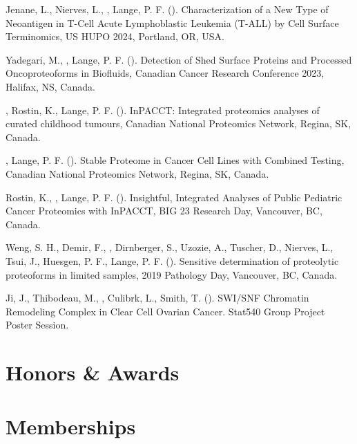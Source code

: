 \documentclass[line]{resonancecv}
\begin{document}
\begin{resume}
\begin{publist}
\item Jenane, L., Nierves, L., , Lange, P. F. (). Characterization of a New Type of Neoantigen in T-Cell Acute Lymphoblastic Leukemia (T-ALL) by Cell Surface Terminomics, US HUPO 2024, Portland, OR, USA.
\item Yadegari, M., , Lange, P. F. (). Detection of Shed Surface Proteins and Processed Oncoproteoforms in Biofluids, Canadian Cancer Research Conference 2023, Halifax, NS, Canada.
\item {}, Rostin, K., Lange, P. F. (). InPACCT: Integrated proteomics analyses of curated childhood tumours, Canadian National Proteomics Network, Regina, SK, Canada.
\item {}, Lange, P. F. (). Stable Proteome in Cancer Cell Lines with Combined Testing, Canadian National Proteomics Network, Regina, SK, Canada.
\item Rostin, K., , Lange, P. F. (). Insightful, Integrated Analyses of Public Pediatric Cancer Proteomics with InPACCT, BIG 23 Research Day, Vancouver, BC, Canada.
\item Weng, S. H., Demir, F., , Dirnberger, S., Uzozie, A., Tuscher, D., Nierves, L., Tsui, J., Huesgen, P. F., Lange, P. F. (). Sensitive determination of proteolytic proteoforms in limited samples, 2019 Pathology Day, Vancouver, BC, Canada.
\item Ji, J., Thibodeau, M., , Culibrk, L., Smith, T. (). SWI/SNF Chromatin Remodeling Complex in Clear Cell Ovarian Cancer. Stat540 Group Project Poster Session.
\end{publist}

\section{Honors \& Awards}

\section{Memberships}


\end{resume}
\end{document}
